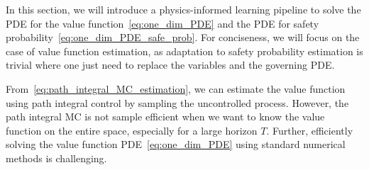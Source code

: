 \documentclass[letterpaper]{article} %
\begin{document}
In this section, we will introduce a physics-informed learning pipeline to solve the PDE for the value function~\eqref{eq:one_dim_PDE} and the PDE for safety probability~\eqref{eq:one_dim_PDE_safe_prob}. For conciseness, we will focus on the case of value function estimation, as adaptation to safety probability estimation is trivial where one just need to replace the variables and the governing PDE.

From~\eqref{eq:path_integral_MC_estimation}, we can estimate the value function using path integral control by sampling the uncontrolled process. However, the path integral MC is not sample efficient when we want to know the value function on the entire space, especially for a large horizon $T$. Further, efficiently solving the value function PDE~\eqref{eq:one_dim_PDE} using standard numerical methods is challenging. 
\end{document}
